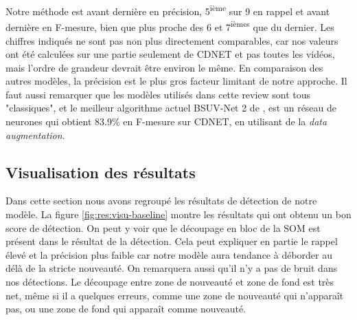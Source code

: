 	Notre méthode est avant dernière en précision, 5\textsuperscript{ième} sur 9 en rappel et avant dernière en F-mesure, bien que plus proche des 6 et 7\textsuperscript{ièmes} que du dernier. Les chiffres indiqués ne sont pas non plus directement comparables, car nos valeurs ont été calculées sur une partie seulement de CDNET et pas toutes les vidéos, mais l'ordre de grandeur devrait être environ le même. En comparaison des autres modèles, la précision est le plus gros facteur limitant de notre approche. Il faut aussi remarquer que les modèles utilisés dans cette review sont tous "classiques", et le meilleur algorithme actuel BSUV-Net 2 de \cite{tezcan2021bsuv}, est un réseau de neurones qui obtient 83.9\% en F-mesure sur CDNET, en utilisant de la \textit{data augmentation}.

	\subsection{Visualisation des résultats}
	
	Dans cette section nous avons regroupé les résultats de détection de notre modèle. La figure \ref{fig:res:visu-baseline} montre les résultats qui ont obtenu un bon score de détection. On peut y voir que le découpage en bloc de la SOM est présent dans le résultat de la détection. Cela peut expliquer en partie le rappel élevé et la précision plus faible car notre modèle aura tendance à déborder au délà de la stricte nouveauté. On remarquera aussi qu'il n'y a pas de bruit dans nos détections. Le découpage entre zone de nouveauté et zone de fond est très net, même si il a quelques erreurs, comme une zone de nouveauté qui n'apparaît pas, ou une zone de fond qui apparaît comme nouveauté.

